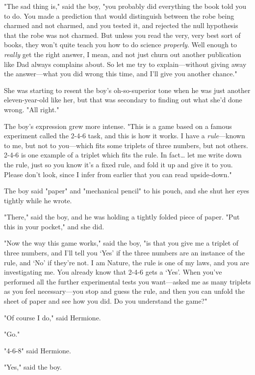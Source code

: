 "The sad thing is," said the boy, "you probably did everything the book told 
you to do. You made a prediction that would distinguish between the robe being 
charmed and not charmed, and you tested it, and rejected the null hypothesis 
that the robe was not charmed. But unless you read the very, very best sort of 
books, they won't quite teach you how to do science \emph{properly}. Well 
enough to \emph{really} get the right answer, I mean, and not just churn out 
another publication like Dad always complains about. So let me try to 
explain---without giving away the answer---what you did wrong this time, and 
I'll give you another chance."

She was starting to resent the boy's oh-so-superior tone when he was just 
another eleven-year-old like her, but that was secondary to finding out what 
she'd done wrong. "All right."

The boy's expression grew more intense. "This is a game based on a famous 
experiment called the 2-{4}-{6} task, and this is how it works. I have a 
\emph{rule}---known to me, but not to you---which fits some triplets of three 
numbers, but not others. 2-{4}-{6} is one example of a triplet which fits the rule. 
In fact{\ldots} let me write down the rule, just so you know it's a fixed rule, 
and fold it up and give it to you. Please don't look, since I infer from 
earlier that you can read upside-down."

The boy said "paper" and "mechanical pencil" to his pouch, and she shut her 
eyes tightly while he wrote.

"There," said the boy, and he was holding a tightly folded piece of paper. "Put 
this in your pocket," and she did.

"Now the way this game works," said the boy, "is that you give me a triplet of 
three numbers, and I'll tell you `Yes' if the three numbers are an instance of 
the rule, and `No' if they're not. I am Nature, the rule is one of my laws, and 
you are investigating me. You already know that 2-{4}-{6} gets a `Yes'. When you've 
performed all the further experimental tests you want---asked me as many 
triplets as you feel necessary---you stop and guess the rule, and then you can 
unfold the sheet of paper and see how you did. Do you understand the game?"

"Of course I do," said Hermione.

"Go."

"4-{6}-{8}" said Hermione.

"Yes," said the boy.

